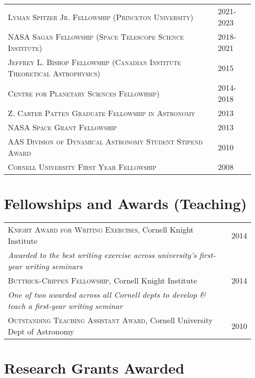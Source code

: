 \documentclass[10pt]{article} %
\begin{document}
\begin{tabular}{l>{\hfill}p{1.7cm}}
\textsc{Lyman Spitzer Jr. Fellowship (Princeton University)} & 2021-2023 \\
\textsc{NASA Sagan Fellowship (Space Telescope Science Institute)} & 2018-2021\\
\textsc{Jeffrey L. Bishop Fellowship (Canadian Institute Theoretical Astrophysics)} & 2015 \\
\textsc{Centre for Planetary Sciences Fellowhsip)} & 2014-2018 \\
\textsc{Z. Carter Patten Graduate Fellowship in Astronomy} & 2013 \\
\textsc{NASA Space Grant Fellowship} & 2013 \\
\textsc{AAS Division of Dynamical Astronomy Student Stipend Award} & 2010\\
\textsc{Cornell University First Year Fellowship} & 2008 \\
\end{tabular}

\section{Fellowships and Awards (Teaching)}

\begin{tabular}{l>{\hfill}p{1.65cm}}
\textsc{Knight Award for Writing Exercises}, Cornell Knight Institute & 2014 \\
{\it Awarded to the best writing exercise across university's first-year writing seminars} \\
\textsc{Buttrick-Crippen Fellowship}, Cornell Knight Institute & 2014 \\
{\it One of two awarded across all Cornell depts to develop \& teach a first-year writing seminar} \\
\textsc{Outstanding Teaching Assistant Award}, Cornell University Dept of Astronomy & 2010 \\
\end{tabular}



\section{Research Grants Awarded}
\end{document}
